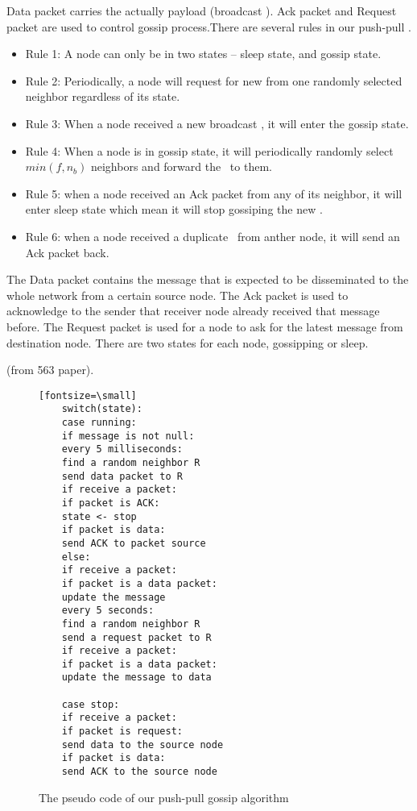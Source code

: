 Data packet carries the actually payload (broadcast \msg). Ack packet and Request packet are used to control gossip process.There are several rules in our push-pull \gp. 
\begin{itemize}
	\item Rule 1: A node can only be in two states -- sleep state, and gossip state.
	\item Rule 2: Periodically, a node will request for new \msg from one randomly selected neighbor regardless of its state.
	\item Rule 3: When a node received a new broadcast \msg, it will enter the gossip state.
	\item Rule 4: When a node is in gossip state, it will periodically randomly select $min(f, n_b)$ neighbors and forward the \msg ~to them.
	\item Rule 5: when a node received an Ack packet from any of its neighbor, it will enter sleep state which mean it will stop gossiping the new \msg.
	\item Rule 6: when a node received a duplicate \msg ~from anther node, it will send an Ack packet back. 
\end{itemize}






The Data packet contains the message that is expected to be disseminated to the whole network from a certain source node. The Ack packet is used to acknowledge to the sender that receiver node already received that message before. The Request packet is used for a node to ask for the latest message from destination node. There are two states for each node, gossipping or sleep.


(from 563 paper).

\begin{figure}
	\centering
	\begin{verbatim}[fontsize=\small]
	switch(state):
	case running:
	if message is not null:
	every 5 milliseconds:
	find a random neighbor R
	send data packet to R
	if receive a packet:
	if packet is ACK:
	state <- stop
	if packet is data:
	send ACK to packet source
	else:
	if receive a packet:
	if packet is a data packet:
	update the message
	every 5 seconds:
	find a random neighbor R
	send a request packet to R
	if receive a packet:
	if packet is a data packet:
	update the message to data
	
	case stop:
	if receive a packet:
	if packet is request:
	send data to the source node
	if packet is data:
	send ACK to the source node
	\end{verbatim}
	\caption{The pseudo code of our push-pull gossip algorithm}
	\label{fig:pseudo}
\end{figure}

